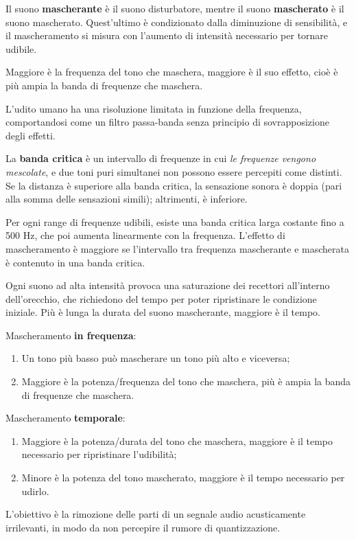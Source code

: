 Il suono \textbf{mascherante} è il suono disturbatore, mentre il suono \textbf{mascherato} è il suono mascherato. Quest'ultimo è condizionato dalla diminuzione di sensibilità, e il mascheramento si misura con l'aumento di intensità necessario per tornare udibile.
 
Maggiore è la frequenza del tono che maschera, maggiore è il suo effetto, cioè è più ampia la banda di frequenze che maschera.
 
L'udito umano ha una risoluzione limitata in funzione della frequenza, comportandosi come un filtro passa-banda senza principio di sovrapposizione degli effetti.
 
La \textbf{banda critica} è un intervallo di frequenze in cui \textit{le frequenze vengono mescolate}, e due toni puri simultanei non possono essere percepiti come distinti. Se la distanza è superiore alla banda critica, la sensazione sonora è doppia (pari alla somma delle sensazioni simili); altrimenti, è inferiore.

Per ogni range di frequenze udibili, esiste una banda critica larga costante fino a 500 Hz, che poi aumenta linearmente con la frequenza. L'effetto di mascheramento è maggiore se l'intervallo tra frequenza mascherante e mascherata è contenuto in una banda critica.

Ogni suono ad alta intensità provoca una saturazione dei recettori all'interno dell'orecchio, che richiedono del tempo per poter ripristinare le condizione iniziale. Più è lunga la durata del suono mascherante, maggiore è il tempo.

Mascheramento \textbf{in frequenza}:
\begin{enumerate}
	\item Un tono più basso può mascherare un tono più alto e viceversa;
	\item Maggiore è la potenza/frequenza del tono che maschera, più è ampia la banda di frequenze che maschera.
\end{enumerate}

Mascheramento \textbf{temporale}:
\begin{enumerate}
	\item Maggiore è la potenza/durata del tono che maschera, maggiore è il tempo necessario per ripristinare l'udibilità;
	\item Minore è la potenza del tono mascherato, maggiore è il tempo necessario per udirlo.
\end{enumerate}

L'obiettivo è la rimozione delle parti di un segnale audio acusticamente irrilevanti, in modo da non percepire il rumore di quantizzazione.

